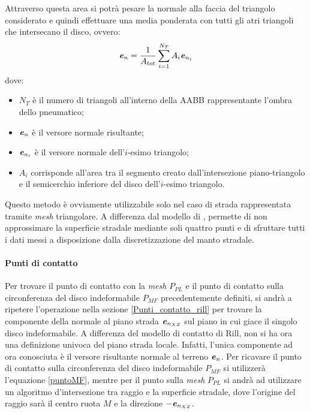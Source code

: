 Attraverso questa area si potrà pesare la normale alla faccia del triangolo considerato e quindi effettuare una media ponderata con tutti gli atri triangoli che intersecano il disco, ovvero:
%
\begin{equation}
\textbf{\textit{e}}_n = \frac{1}{A_{tot}}\sum_{i=1}^{N_T}A_i\textbf{\textit{e}}_{n_i}
\label{ponderata}
\end{equation}
%
dove:
\begin{itemize}
	\item $N_T$ è il numero di triangoli all'interno della \ac{AABB} rappresentante l'ombra dello pneumatico;
	\item $\textbf{\textit{e}}_n$ è il versore normale risultante;
	\item $\textbf{\textit{e}}_{n_i}$ è il versore normale dell'$i$-esimo triangolo;
	\item $A_i$ corrisponde all'area tra il segmento creato dall'intersezione piano-triangolo e il semicerchio inferiore del disco dell'$i$-esimo triangolo.
\end{itemize}

Questo metodo è ovviamente utilizzabile solo nel caso di strada rappresentata tramite \textit{mesh} triangolare. A differenza dal modello di \cite{Rill}, permette di non approssimare la superficie stradale mediante soli quattro punti e di sfruttare tutti i dati messi a disposizione dalla discretizzazione del manto stradale.
%
\paragraph{Punti di contatto}
Per trovare il punto di contatto con la \textit{mesh} $P_{PL}$ e il punto di contatto sulla circonferenza del disco indeformabile $P_{MF}$ precedentemente definiti, si andrà a ripetere l'operazione nella sezione \ref{Punti_contatto_rill} per trovare la componente della normale al piano strada $\textbf{\textit{e}}_{n_{XZ}}$ sul piano in cui giace il singolo disco indeformabile. A differenza del modello di contatto di Rill, non si ha ora una definizione univoca del piano strada locale. Infatti, l'unica componente ad ora conosciuta è il versore risultante normale al terreno $\textbf{\textit{e}}_n$. Per ricavare il punto di contatto sulla circonferenza del disco indeformabile $P_{MF}$ si utilizzerà l'equazione \eqref{puntoMF}, mentre per il punto sulla \textit{mesh} $P_{PL}$ si andrà ad utilizzare un algoritmo d'intersezione tra raggio e la superficie stradale, dove l'origine del raggio sarà il centro ruota $M$ e la direzione $-\textbf{\textit{e}}_{n_{XZ}}$.

